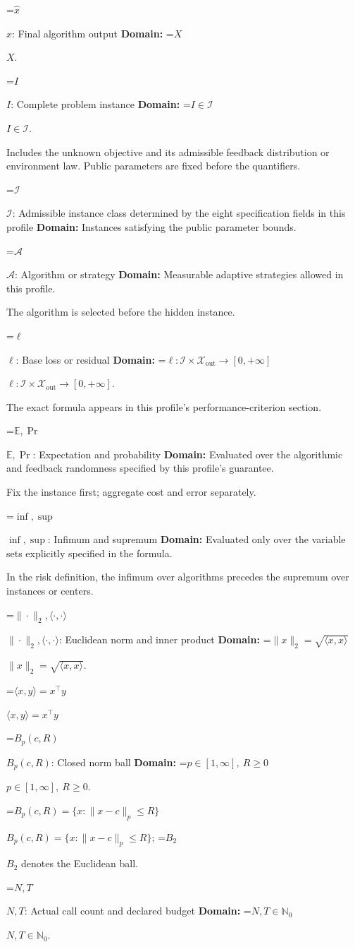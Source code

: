 \documentclass[10pt,a4paper]{article}
\newcommand{\AtlasMath}[1]{\par\begingroup\centering\setbox0=\hbox{$\displaystyle #1$}\ifdim\wd0>1.4\linewidth\typeout{ATLAS WIDE FORMULA: \the\wd0}\fi\ifdim\wd0>\linewidth\resizebox{\linewidth}{!}{\box0}\else\box0\fi\par\endgroup}
\newcommand{\AtlasInlineMath}[1]{\begingroup\setbox0=\hbox{$#1$}\ifdim\wd0>.4\linewidth\endgroup\AtlasMath{#1}\else\endgroup$#1$\fi}
\begin{document}
\AtlasInlineMath{\widehat{x}}: Final algorithm output \textbf{Domain:} \AtlasInlineMath{X}.

\AtlasInlineMath{I}: Complete problem instance \textbf{Domain:} \AtlasInlineMath{I\in\mathcal{I}}.

Includes the unknown objective and its admissible feedback distribution or environment law. Public parameters are fixed before the quantifiers.

\AtlasInlineMath{\mathcal{I}}: Admissible instance class determined by the eight specification fields in this profile \textbf{Domain:} Instances satisfying the public parameter bounds.

\AtlasInlineMath{\mathcal{A}}: Algorithm or strategy \textbf{Domain:} Measurable adaptive strategies allowed in this profile.

The algorithm is selected before the hidden instance.

\AtlasInlineMath{\ell}: Base loss or residual \textbf{Domain:} \AtlasInlineMath{\ell:\mathcal{I}\times\mathcal{X}_{\mathrm{out}}\to[0,+\infty]}.

The exact formula appears in this profile's performance-criterion section.

\AtlasInlineMath{\mathbb{E},\Pr}: Expectation and probability \textbf{Domain:} Evaluated over the algorithmic and feedback randomness specified by this profile's guarantee.

Fix the instance first; aggregate cost and error separately.

\AtlasInlineMath{\inf,\sup}: Infimum and supremum \textbf{Domain:} Evaluated only over the variable sets explicitly specified in the formula.

In the risk definition, the infimum over algorithms precedes the supremum over instances or centers.

\AtlasInlineMath{\|\cdot\|_2,\langle\cdot,\cdot\rangle}: Euclidean norm and inner product \textbf{Domain:} \AtlasInlineMath{\|x\|_2=\sqrt{\langle x,x\rangle}}.

\AtlasInlineMath{\langle x,y\rangle=x^\top y}

\AtlasInlineMath{B_p(c,R)}: Closed norm ball \textbf{Domain:} \AtlasInlineMath{p\in[1,\infty],\ R\ge0}.

\AtlasInlineMath{B_p(c,R)=\{x:\|x-c\|_p\le R\}}; \AtlasInlineMath{B_2} denotes the Euclidean ball.

\AtlasInlineMath{N,T}: Actual call count and declared budget \textbf{Domain:} \AtlasInlineMath{N,T\in\mathbb{N}_0}.
\end{document}
